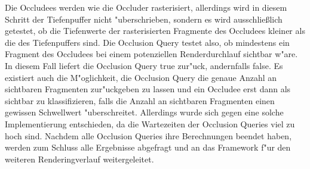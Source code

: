 \documentclass[journal]{vgtc}
\begin{document}
Die Occludees werden wie die Occluder rasterisiert, allerdings wird in diesem Schritt der Tiefenpuffer nicht "uberschrieben, sondern es wird ausschlie{\ss}lich getestet, ob
die Tiefenwerte der rasterisierten Fragmente des Occludees kleiner als die des Tiefenpuffers sind.
Die Occlusion Query testet also, ob mindestens ein Fragment des Occludees bei einem potenziellen Renderdurchlauf sichtbar w"are.
In diesem Fall liefert die Occlusion Query \glqq true\grqq{} zur"uck, andernfalls \glqq false\grqq{}.
Es existiert auch die M"oglichkeit, die Occlusion Query die genaue Anzahl an sichtbaren Fragmenten zur"uckgeben zu lassen und ein Occludee erst dann als sichtbar zu klassifizieren, falls die Anzahl an sichtbaren Fragmenten einen gewissen Schwellwert "uberschreitet.
Allerdings wurde sich gegen eine solche Implementierung entschieden, da die Wartezeiten der Occlusion Queries viel zu hoch sind.
Nachdem alle Occlusion Queries ihre Berechnungen beendet haben, werden zum Schluss alle Ergebnisse abgefragt und an das Framework f"ur den weiteren Renderingverlauf weitergeleitet.
\end{document}
